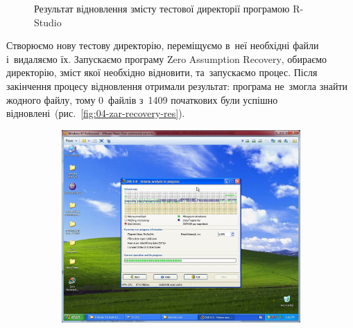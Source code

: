 \documentclass[
	a4paper,
	oneside,
	DIV = 12,
	fontsize = 13pt,
	headings = normal,
]{scrartcl}
\begin{document}
\begin{figure}[!htbp]
\begin{subfigure}{0.5\columnwidth}
				\caption{}
				\label{subfig:03-02-dir-contents}
			\end{subfigure}
			\caption{Результат відновлення змісту тестової директорії програмою \textenglish{R-Studio}}
			\label{fig:03-rstudio-recovery-res}
		\end{figure}

		Створюємо нову тестову директорію, переміщуємо в~неї необхідні файли і~видаляємо їх. Запускаємо програму \textenglish{Zero Assumption Recovery}, обираємо директорію, зміст якої необхідно відновити, та~запускаємо процес. Після закінчення процесу відновлення отримали результат: програма не~змогла знайти жодного файлу, тому 0~файлів з~1409 початкових були успішно відновлені~(рис.~\ref{fig:04-zar-recovery-res}).

		\begin{figure}[!htbp]
			\centering
			\begin{subfigure}{0.5\columnwidth}
				\centering
				\includegraphics[height = 9.5\baselineskip]{./assets/y03s01-pcdiag-lab-03-p07.jpg}
				\caption{}
				\label{subfig:04-01-zar-window}
			\end{subfigure}%
			\begin{subfigure}{0.5\columnwidth}
				\centering

\end{subfigure}
\end{figure}
\end{document}

